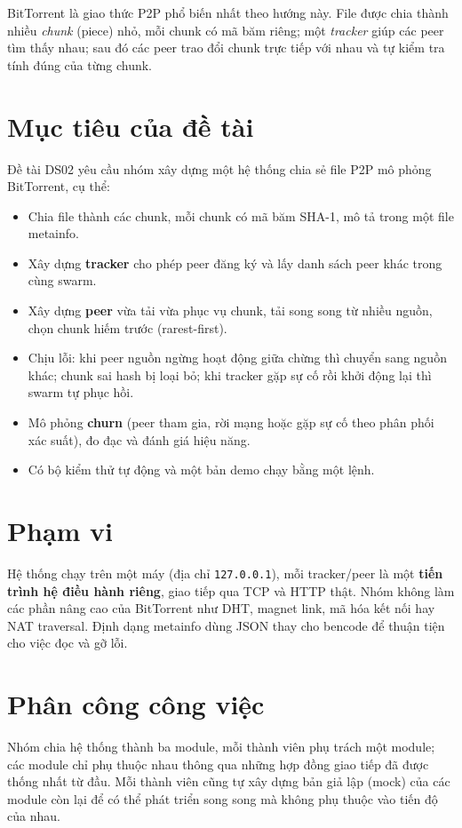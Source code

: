 \documentclass[12pt,a4paper,oneside]{report}
\begin{document}
BitTorrent là giao thức P2P phổ biến nhất theo hướng này. File được chia thành nhiều \textit{chunk} (piece) nhỏ, mỗi chunk có mã băm riêng; một \textit{tracker} giúp các peer tìm thấy nhau; sau đó các peer trao đổi chunk trực tiếp với nhau và tự kiểm tra tính đúng của từng chunk.

\section{Mục tiêu của đề tài}

Đề tài DS02 yêu cầu nhóm xây dựng một hệ thống chia sẻ file P2P mô phỏng BitTorrent, cụ thể:
\begin{itemize}
  \item Chia file thành các chunk, mỗi chunk có mã băm SHA-1, mô tả trong một file metainfo.
  \item Xây dựng \textbf{tracker} cho phép peer đăng ký và lấy danh sách peer khác trong cùng swarm.
  \item Xây dựng \textbf{peer} vừa tải vừa phục vụ chunk, tải song song từ nhiều nguồn, chọn chunk hiếm trước (rarest-first).
  \item Chịu lỗi: khi peer nguồn ngừng hoạt động giữa chừng thì chuyển sang nguồn khác; chunk sai hash bị loại bỏ; khi tracker gặp sự cố rồi khởi động lại thì swarm tự phục hồi.
  \item Mô phỏng \textbf{churn} (peer tham gia, rời mạng hoặc gặp sự cố theo phân phối xác suất), đo đạc và đánh giá hiệu năng.
  \item Có bộ kiểm thử tự động và một bản demo chạy bằng một lệnh.
\end{itemize}

\section{Phạm vi}

Hệ thống chạy trên một máy (địa chỉ \texttt{127.0.0.1}), mỗi tracker/peer là một \textbf{tiến trình hệ điều hành riêng}, giao tiếp qua TCP và HTTP thật. Nhóm không làm các phần nâng cao của BitTorrent như DHT, magnet link, mã hóa kết nối hay NAT traversal. Định dạng metainfo dùng JSON thay cho bencode để thuận tiện cho việc đọc và gỡ lỗi.

\section{Phân công công việc}

Nhóm chia hệ thống thành ba module, mỗi thành viên phụ trách một module; các module chỉ phụ thuộc nhau thông qua những hợp đồng giao tiếp đã được thống nhất từ đầu. Mỗi thành viên cũng tự xây dựng bản giả lập (mock) của các module còn lại để có thể phát triển song song mà không phụ thuộc vào tiến độ của nhau.
\end{document}
